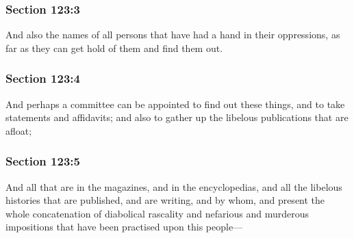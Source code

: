 	\subsubsection{Section 123:3} %
		\label{DC123-3}

		And also the names of all persons that have had a hand in their oppressions, as far as they can get hold of them and find them out.


	\subsubsection{Section 123:4} %
		\label{DC123-4}

		And perhaps a committee can be appointed to find out these things, and to take statements and affidavits; and also to gather up the libelous publications that are afloat;


	\subsubsection{Section 123:5} %
		\label{DC123-5}

		And all that are in the magazines, and in the encyclopedias, and all the libelous histories that are published, and are writing, and by whom, and present the whole concatenation of diabolical rascality and nefarious and murderous impositions that have been practised upon this people—


